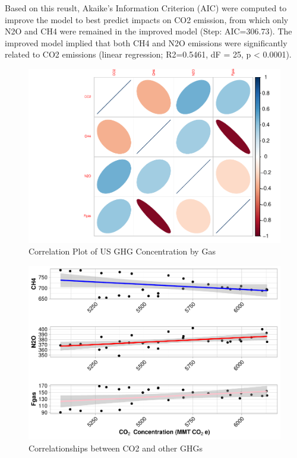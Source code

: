 \documentclass[12pt,]{article}
\begin{document}
Based on this reuslt, Akaike's Information Criterion (AIC) were computed
to improve the model to best predict impacts on CO2 emission, from which
only N2O and CH4 were remained in the improved model (Step: AIC=306.73).
The improved model implied that both CH4 and N2O emissions were
significantly related to CO2 emissions (linear regression; R2=0.5461, dF
= 25, p \textless{} 0.0001).

\begin{figure}
\centering
\includegraphics{Project_Code_files/figure-latex/unnamed-chunk-20-1.pdf}
\caption{Correlation Plot of US GHG Concentration by Gas}
\end{figure}

\begin{figure}
\centering
\includegraphics{Project_Code_files/figure-latex/unnamed-chunk-21-1.pdf}
\caption{Correlationships between CO2 and other GHGs}
\end{figure}
\end{document}
